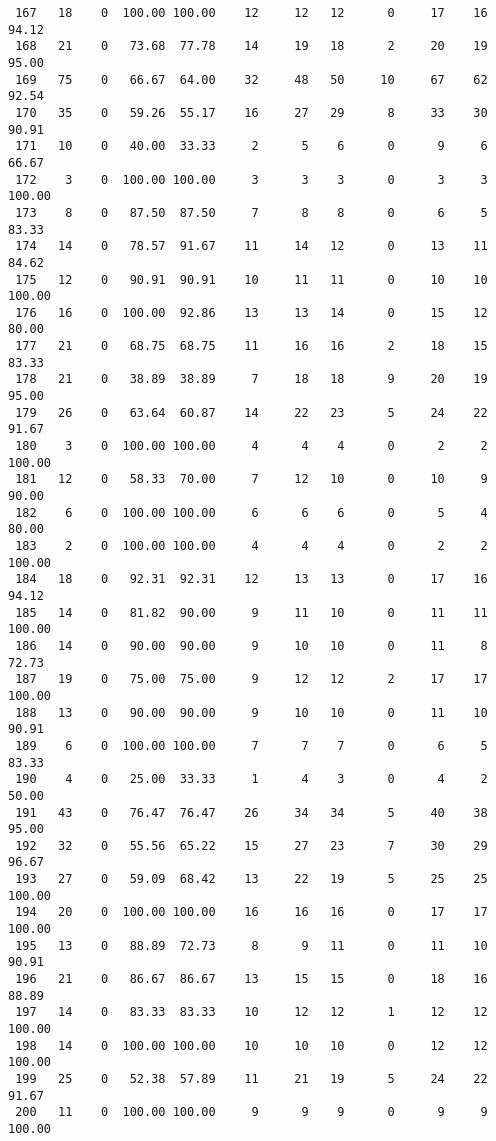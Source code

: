 \begin{verbatim}
 167   18    0  100.00 100.00    12     12   12      0     17    16    94.12
 168   21    0   73.68  77.78    14     19   18      2     20    19    95.00
 169   75    0   66.67  64.00    32     48   50     10     67    62    92.54
 170   35    0   59.26  55.17    16     27   29      8     33    30    90.91
 171   10    0   40.00  33.33     2      5    6      0      9     6    66.67
 172    3    0  100.00 100.00     3      3    3      0      3     3   100.00
 173    8    0   87.50  87.50     7      8    8      0      6     5    83.33
 174   14    0   78.57  91.67    11     14   12      0     13    11    84.62
 175   12    0   90.91  90.91    10     11   11      0     10    10   100.00
 176   16    0  100.00  92.86    13     13   14      0     15    12    80.00
 177   21    0   68.75  68.75    11     16   16      2     18    15    83.33
 178   21    0   38.89  38.89     7     18   18      9     20    19    95.00
 179   26    0   63.64  60.87    14     22   23      5     24    22    91.67
 180    3    0  100.00 100.00     4      4    4      0      2     2   100.00
 181   12    0   58.33  70.00     7     12   10      0     10     9    90.00
 182    6    0  100.00 100.00     6      6    6      0      5     4    80.00
 183    2    0  100.00 100.00     4      4    4      0      2     2   100.00
 184   18    0   92.31  92.31    12     13   13      0     17    16    94.12
 185   14    0   81.82  90.00     9     11   10      0     11    11   100.00
 186   14    0   90.00  90.00     9     10   10      0     11     8    72.73
 187   19    0   75.00  75.00     9     12   12      2     17    17   100.00
 188   13    0   90.00  90.00     9     10   10      0     11    10    90.91
 189    6    0  100.00 100.00     7      7    7      0      6     5    83.33
 190    4    0   25.00  33.33     1      4    3      0      4     2    50.00
 191   43    0   76.47  76.47    26     34   34      5     40    38    95.00
 192   32    0   55.56  65.22    15     27   23      7     30    29    96.67
 193   27    0   59.09  68.42    13     22   19      5     25    25   100.00
 194   20    0  100.00 100.00    16     16   16      0     17    17   100.00
 195   13    0   88.89  72.73     8      9   11      0     11    10    90.91
 196   21    0   86.67  86.67    13     15   15      0     18    16    88.89
 197   14    0   83.33  83.33    10     12   12      1     12    12   100.00
 198   14    0  100.00 100.00    10     10   10      0     12    12   100.00
 199   25    0   52.38  57.89    11     21   19      5     24    22    91.67
 200   11    0  100.00 100.00     9      9    9      0      9     9   100.00

\end{verbatim}
